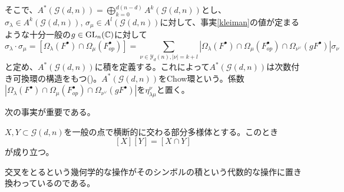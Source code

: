 \documentclass{ltjsreport}
\begin{document}
そこで、$A^*(\mathcal{G}(d,n))=\bigoplus_{k=0}^{d(n-d)}A^k(\mathcal{G}(d,n))$とし、$\sigma_\lambda\in A^k(\mathcal{G}(d,n))$, $\sigma_\mu\in A^l(\mathcal{G}(d,n))$に対して、事実\ref{kleiman}の値が定まるような十分一般の$g\in\text{GL}_n(\mathbb{C})$に対して
\[
\sigma_\lambda\cdot\sigma_\mu
=[\Omega_{\lambda}(F^\bullet)\cap\Omega_{\mu}(F^\bullet_{op})]
=\sum_{\nu\in\mathcal{Y}_d(n),|\nu|=k+l}|\Omega_{\lambda}(F^\bullet)\cap\Omega_{\mu}(F^\bullet_{op})\cap\Omega_{\nu^\vee}(gF^\bullet)|\sigma_\nu
\]
と定め、$A^*(\mathcal{G}(d,n))$に積を定義する。これによって$A^*(\mathcal{G}(d,n))$は次数付き可換環の構造をもつ(\cite{3264})。$A^*(\mathcal{G}(d,n))$をChow環という。係数$|\Omega_{\lambda}(F^\bullet)\cap\Omega_{\mu}(F^\bullet_{op})\cap\Omega_{\nu^\vee}(gF^\bullet)|$を$\eta_{\lambda\mu}^\nu$と置く。

次の事実が重要である。

\begin{fact}[\cite{3264}]\label{intersection}
  $X,Y\subset\mathcal{G}(d,n)$を一般の点で横断的に交わる部分多様体とする。このとき
  \[
  [X][Y]=[X\cap Y]  
  \]
  が成り立つ。
\end{fact}

交叉をとるという幾何学的な操作がそのシンボルの積という代数的な操作に置き換わっているのである。
\end{document}
